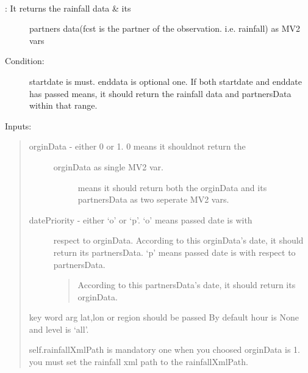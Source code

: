 \documentclass[letterpaper,10pt,english]{sphinxmanual}
\begin{document}
\begin{fulllineitems}
\begin{fulllineitems}
\label{diagnosisutils:xml_data_access.GribXmlAccess.getRainfallDataPartners}~\begin{description}
\item[{{\hyperref[diagnosisutils:xml_data_access.GribXmlAccess.getRainfallDataPartners]{}}: It returns the rainfall data \& its}] \leavevmode
partners data(fcst is the partner of the observation.
i.e. rainfall) as MV2 vars

\item[{Condition:}] \leavevmode
startdate is must. enddata is optional one.
If both startdate and enddate has passed means, it should
return the rainfall data and partnersData within that range.

\end{description}

Inputs:
\begin{quote}
\begin{description}
\item[{orginData - either 0 or 1. 0 means it shouldnot return the}] \leavevmode\begin{description}
\item[{orginData as single MV2 var.}]  means it should return both the orginData and its
partnersData as two seperate MV2 vars.

\end{description}

\item[{datePriority - either `o' or `p'. `o' means passed date is with}] \leavevmode
respect to orginData. According to this orginData's
date, it should return its partnersData.
`p' means passed date is with respect to partnersData.
\begin{quote}

According to this partnersData's date, it should
return its orginData.
\end{quote}

\end{description}

key word arg lat,lon or region should be passed
By default hour is None and level is `all'.

self.rainfallXmlPath is mandatory one when you choosed orginData
is 1. you must set the rainfall xml path to the rainfallXmlPath.


\end{quote}
\end{fulllineitems}
\end{fulllineitems}
\end{document}
